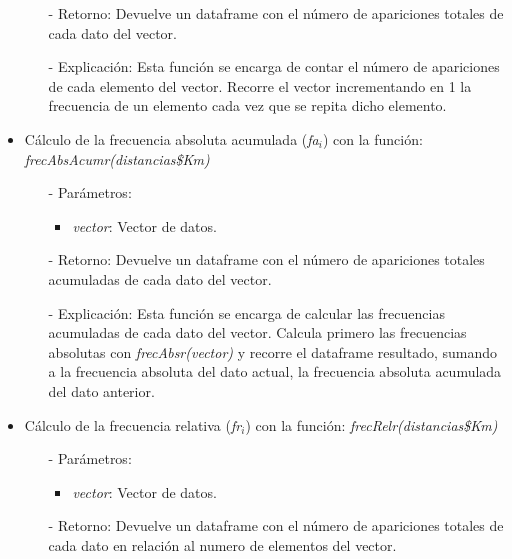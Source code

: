 \documentclass[a4paper, 12pt]{article}
\begin{document}
\begin{itemize}
\begin{itemize}
                \item[-] Retorno: Devuelve un dataframe con el número de apariciones totales de cada dato del vector. 

                \item[-] Explicación: Esta función se encarga de contar el número de apariciones de cada elemento del vector. Recorre el vector incrementando en 1 la frecuencia de un elemento cada vez que se repita dicho elemento.
            \end{itemize}
        
            \item Cálculo de la frecuencia absoluta acumulada (\emph{fa$_{i}$}) con la función: \emph{frecAbsAcumr(distancias\$Km)}
            \begin{itemize}
                \item[-] Parámetros: 
                \begin{itemize}
                    \item \emph{vector}: Vector de datos.
                \end{itemize}

                \item[-] Retorno: Devuelve un dataframe con el número de apariciones totales acumuladas de cada dato del vector. 

                \item[-] Explicación: Esta función se encarga de calcular las frecuencias acumuladas de cada dato del vector. Calcula primero las frecuencias absolutas con \emph{frecAbsr(vector)} y recorre el dataframe resultado, sumando a la frecuencia absoluta del dato actual, la frecuencia absoluta acumulada del dato anterior.
            \end{itemize}
        
            \item Cálculo de la frecuencia relativa (\emph{fr$_{i}$}) con la función: \emph{frecRelr(distancias\$Km)}
            \begin{itemize}
                \item[-] Parámetros: 
                \begin{itemize}
                    \item \emph{vector}: Vector de datos.
                \end{itemize}

                \item[-] Retorno: Devuelve un dataframe con el número de apariciones totales de cada dato en relación al numero de elementos del vector. 


\end{itemize}
\end{itemize}
\end{document}
